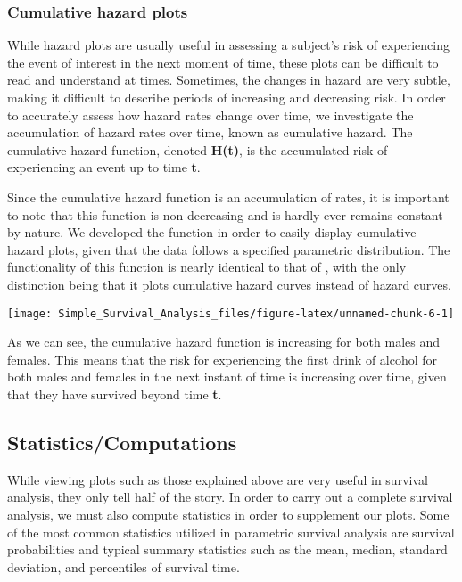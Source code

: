 \hypertarget{cumulative-hazard-plots}{%
\subsubsection{Cumulative hazard plots}\label{cumulative-hazard-plots}}

While hazard plots are usually useful in assessing a subject's risk of
experiencing the event of interest in the next moment of time, these
plots can be difficult to read and understand at times. Sometimes, the
changes in hazard are very subtle, making it difficult to describe
periods of increasing and decreasing risk. In order to accurately assess
how hazard rates change over time, we investigate the accumulation of
hazard rates over time, known as cumulative hazard. The cumulative
hazard function, denoted \textbf{H(t)}, is the accumulated risk of
experiencing an event up to time \textbf{t}.

Since the cumulative hazard function is an accumulation of rates, it is
important to note that this function is non-decreasing and is hardly
ever remains constant by nature. We developed the function
 in order to easily display cumulative hazard plots,
given that the data follows a specified parametric distribution. The
functionality of this function is nearly identical to that of
, with the only distinction being that it plots
cumulative hazard curves instead of hazard curves.

\begin{Schunk}

\texttt{[image: Simple\_Survival\_Analysis\_files/figure-latex/unnamed-chunk-6-1]} \end{Schunk}

As we can see, the cumulative hazard function is increasing for both
males and females. This means that the risk for experiencing the first
drink of alcohol for both males and females in the next instant of time
is increasing over time, given that they have survived beyond time
\textbf{t}.

\hypertarget{statisticscomputations}{%
\subsection{Statistics/Computations}\label{statisticscomputations}}

While viewing plots such as those explained above are very useful in
survival analysis, they only tell half of the story. In order to carry
out a complete survival analysis, we must also compute statistics in
order to supplement our plots. Some of the most common statistics
utilized in parametric survival analysis are survival probabilities and
typical summary statistics such as the mean, median, standard deviation,
and percentiles of survival time.

